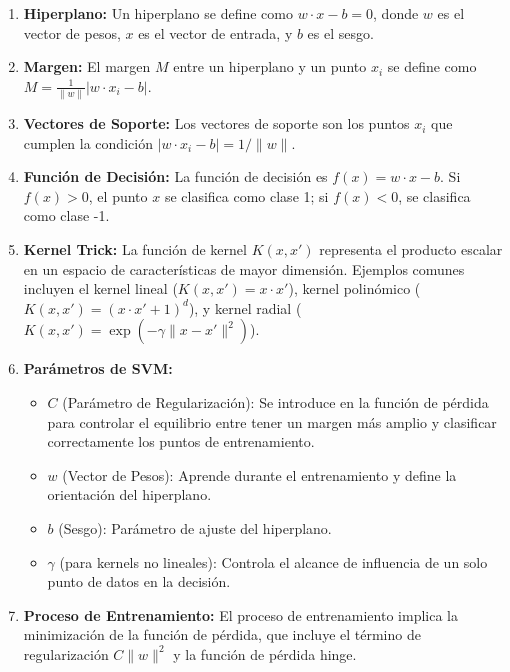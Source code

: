\documentclass[12pt]{article}
\begin{document}
\begin{enumerate}
    \item \textbf{Hiperplano:}
        Un hiperplano se define como \(w \cdot x - b = 0\), donde \(w\) es el vector de pesos, \(x\) es el vector de entrada, y \(b\) es el sesgo.

    \item \textbf{Margen:}
        El margen \(M\) entre un hiperplano y un punto \(x_i\) se define como \(M = \frac{1}{\|w\|} |w \cdot x_i - b|\).

    \item \textbf{Vectores de Soporte:}
        Los vectores de soporte son los puntos \(x_i\) que cumplen la condición \(|w \cdot x_i - b| = 1/\|w\|\).

    \item \textbf{Función de Decisión:}
        La función de decisión es \(f(x) = w \cdot x - b\). Si \(f(x) > 0\), el punto \(x\) se clasifica como clase 1; si \(f(x) < 0\), se clasifica como clase -1.

    \item \textbf{Kernel Trick:}
        La función de kernel \(K(x, x')\) representa el producto escalar en un espacio de características de mayor dimensión. Ejemplos comunes incluyen el kernel lineal (\(K(x, x') = x \cdot x'\)), kernel polinómico (\(K(x, x') = (x \cdot x' + 1)^d\)), y kernel radial (\(K(x, x') = \exp(-\gamma \|x - x'\|^2)\)).

    \item \textbf{Parámetros de SVM:}
        \begin{itemize}
            \item \(C\) (Parámetro de Regularización): Se introduce en la función de pérdida para controlar el equilibrio entre tener un margen más amplio y clasificar correctamente los puntos de entrenamiento.
            \item \(w\) (Vector de Pesos): Aprende durante el entrenamiento y define la orientación del hiperplano.
            \item \(b\) (Sesgo): Parámetro de ajuste del hiperplano.
            \item \(\gamma\) (para kernels no lineales): Controla el alcance de influencia de un solo punto de datos en la decisión.
        \end{itemize}

    \item \textbf{Proceso de Entrenamiento:}
        El proceso de entrenamiento implica la minimización de la función de pérdida, que incluye el término de regularización \(C\|w\|^2\) y la función de pérdida hinge.


\end{enumerate}
\end{document}
